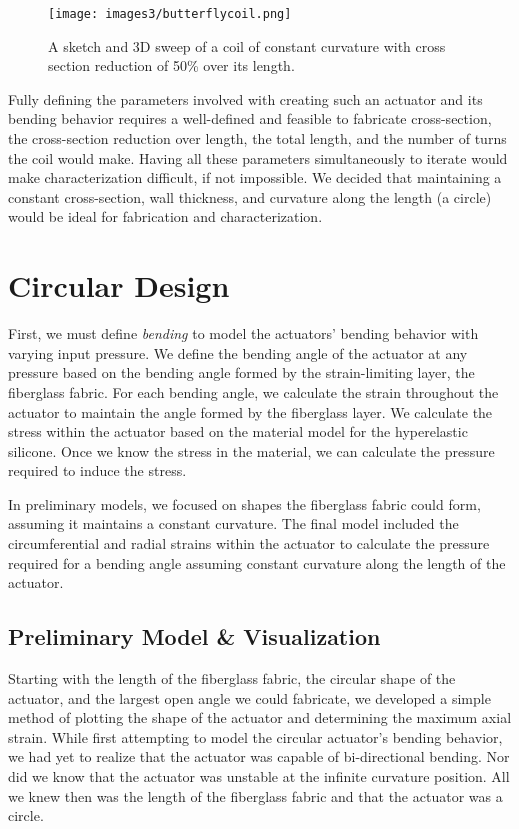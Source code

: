 \begin{figure}[ht]
    \centering
    \texttt{[image: images3/butterflycoil.png]}
    \caption{A sketch and 3D sweep of a coil of constant curvature with cross section reduction of 50\% over its length.}
    \label{fig:butterflycoil}
\end{figure}

Fully defining the parameters involved with creating such an actuator and its bending behavior requires a well-defined and feasible to fabricate cross-section, the cross-section reduction over length, the total length, and the number of turns the coil would make. Having all these parameters simultaneously to iterate would make characterization difficult, if not impossible. We decided that maintaining a constant cross-section, wall thickness, and curvature along the length (a circle) would be ideal for fabrication and characterization. 

\section{Circular Design}

First, we must define \emph{bending} to model the actuators' bending behavior with varying input pressure. We define the bending angle of the actuator at any pressure based on the bending angle formed by the strain-limiting layer, the fiberglass fabric. For each bending angle, we calculate the strain throughout the actuator to maintain the angle formed by the fiberglass layer. We calculate the stress within the actuator based on the material model for the hyperelastic silicone. Once we know the stress in the material, we can calculate the pressure required to induce the stress. 

In preliminary models, we focused on shapes the fiberglass fabric could form, assuming it maintains a constant curvature. The final model included the circumferential and radial strains within the actuator to calculate the pressure required for a bending angle assuming constant curvature along the length of the actuator. 

\subsection{Preliminary Model \& Visualization}

Starting with the length of the fiberglass fabric, the circular shape of the actuator, and the largest open angle we could fabricate, we developed a simple method of plotting the shape of the actuator and determining the maximum axial strain. While first attempting to model the circular actuator's bending behavior, we had yet to realize that the actuator was capable of bi-directional bending. Nor did we know that the actuator was unstable at the infinite curvature position. All we knew then was the length of the fiberglass fabric and that the actuator was a circle. 

